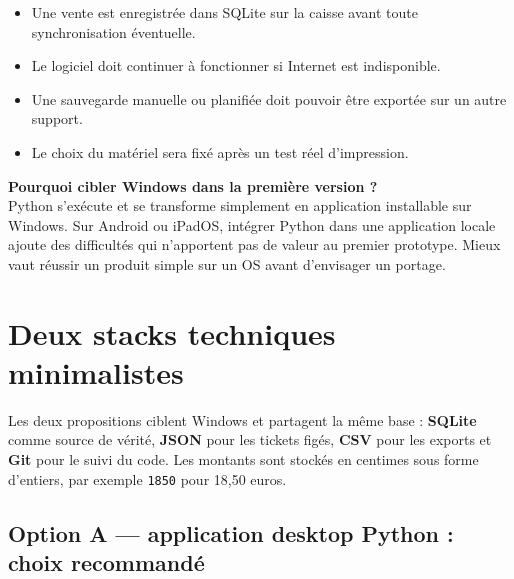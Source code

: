 \documentclass[11pt,a4paper]{article}
\begin{document}
\begin{itemize}
  \item Une vente est enregistrée dans SQLite sur la caisse avant toute synchronisation éventuelle.
  \item Le logiciel doit continuer à fonctionner si Internet est indisponible.
  \item Une sauvegarde manuelle ou planifiée doit pouvoir être exportée sur un autre support.
  \item Le choix du matériel sera fixé après un test réel d'impression.
\end{itemize}

\begin{tcolorbox}[
  colback=softblue,
  colframe=secondary,
  boxrule=0.55pt,
  arc=2pt,
  left=8pt,right=8pt,top=6pt,bottom=6pt
]
\textbf{Pourquoi cibler Windows dans la première version ?}\\
Python s'exécute et se transforme simplement en application installable sur Windows. Sur Android
ou iPadOS, intégrer Python dans une application locale ajoute des difficultés qui n'apportent pas
de valeur au premier prototype. Mieux vaut réussir un produit simple sur un OS avant d'envisager
un portage.
\end{tcolorbox}

\section{Deux stacks techniques minimalistes}

Les deux propositions ciblent Windows et partagent la même base : \textbf{SQLite} comme source de
vérité, \textbf{JSON} pour les tickets figés, \textbf{CSV} pour les exports et \textbf{Git} pour le
suivi du code. Les montants sont stockés en centimes sous forme d'entiers, par exemple
\texttt{1850} pour 18,50 euros.

\subsection{Option A --- application desktop Python : choix recommandé}
\end{document}
